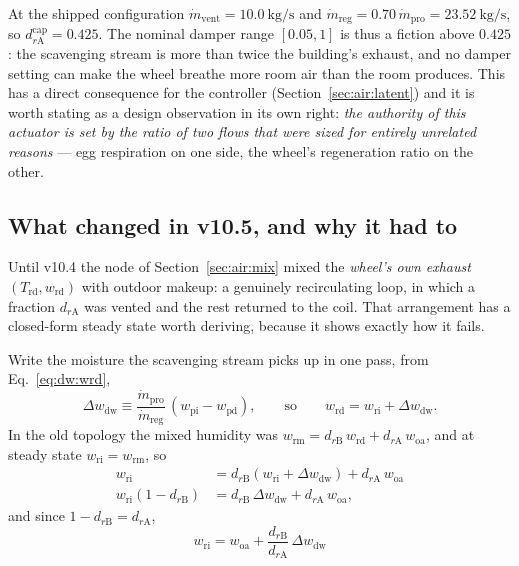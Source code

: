 \documentclass[11pt]{article}
\newcommand{\mdp}{\ensuremath{\dot m_{\mathrm{pro}}}}
\newcommand{\mdr}{\ensuremath{\dot m_{\mathrm{reg}}}}
\newcommand{\mdv}{\ensuremath{\dot m_{\mathrm{vent}}}}
\begin{document}
At the shipped configuration $\mdv=\SI{10.0}{\kilogram\per\second}$ and
$\mdr=0.70\,\mdp=\SI{23.52}{\kilogram\per\second}$, so
$d_{r\mathrm{A}}^{\mathrm{cap}}=\num{0.425}$. The nominal damper range
$[0.05,1]$ is thus a fiction above $0.425$: the scavenging stream is more than
twice the building's exhaust, and no damper setting can make the wheel breathe
more room air than the room produces. This has a direct consequence for the
controller (Section~\ref{sec:air:latent}) and it is worth stating as a design
observation in its own right: \emph{the authority of this actuator is set by
the ratio of two flows that were sized for entirely unrelated reasons} ---
egg respiration on one side, the wheel's regeneration ratio on the other.

\subsection{What changed in v10.5, and why it had to}
\label{sec:air:v105}

Until v10.4 the node of Section~\ref{sec:air:mix} mixed the \emph{wheel's own
exhaust} $(T_{\mathrm{rd}},w_{\mathrm{rd}})$ with outdoor makeup: a genuinely
recirculating loop, in which a fraction $d_{r\mathrm{A}}$ was vented and the
rest returned to the coil. That arrangement has a closed-form steady state
worth deriving, because it shows exactly how it fails.

Write the moisture the scavenging stream picks up in one pass, from
Eq.~\eqref{eq:dw:wrd},
\begin{equation}
\Delta w_{\mathrm{dw}} \equiv \frac{\mdp}{\mdr}\,
\left(w_{\mathrm{pi}}-w_{\mathrm{pd}}\right),
\qquad\text{so}\qquad
w_{\mathrm{rd}} = w_{\mathrm{ri}} + \Delta w_{\mathrm{dw}} .
\label{eq:air:dwdw}
\end{equation}
In the old topology the mixed humidity was
$w_{\mathrm{rm}} = d_{r\mathrm{B}}\,w_{\mathrm{rd}} + d_{r\mathrm{A}}\,
w_{\mathrm{oa}}$, and at steady state $w_{\mathrm{ri}}=w_{\mathrm{rm}}$, so
\begin{align*}
w_{\mathrm{ri}}
 &= d_{r\mathrm{B}}\left(w_{\mathrm{ri}}+\Delta w_{\mathrm{dw}}\right)
   + d_{r\mathrm{A}}\,w_{\mathrm{oa}}\\
w_{\mathrm{ri}}\left(1-d_{r\mathrm{B}}\right)
 &= d_{r\mathrm{B}}\,\Delta w_{\mathrm{dw}} + d_{r\mathrm{A}}\,w_{\mathrm{oa}},
\end{align*}
and since $1-d_{r\mathrm{B}}=d_{r\mathrm{A}}$,
\begin{equation}
\boxed{\;
w_{\mathrm{ri}} = w_{\mathrm{oa}}
+ \frac{d_{r\mathrm{B}}}{d_{r\mathrm{A}}}\,\Delta w_{\mathrm{dw}}
\;}
\label{eq:air:buildup}
\end{equation}
\end{document}
